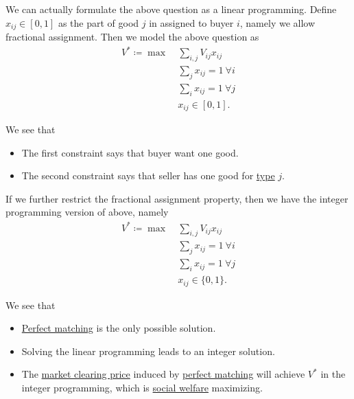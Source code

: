 We can actually formulate the above question as a linear programming. Define \(x_{ij} \in [0, 1]\) as the part of good \(j\) in assigned to buyer \(i\), namely we allow fractional assignment. Then we model the above question as
\[
	\begin{aligned}
		V^{\ast} \coloneqq \max~ & \sum\limits_{i, j}V_{ij}x_{ij}       \\
		                         & \sum\limits_{j}x_{ij} = 1\ \forall i \\
		                         & \sum\limits_{i}x_{ij} = 1\ \forall j \\
		                         & x_{ij}\in[0, 1].
	\end{aligned}
\]
\begin{intuition}
	We see that
	\begin{itemize}
		\item The first constraint says that buyer want one good.
		\item The second constraint says that seller has one good for \hyperref[def:type]{type} \(j\).
	\end{itemize}
\end{intuition}

If we further restrict the fractional assignment property, then we have the integer programming version of above, namely
\[
	\begin{aligned}
		V^{\ast} \coloneqq \max~ & \sum\limits_{i, j}V_{ij}x_{ij}       \\
		                         & \sum\limits_{j}x_{ij} = 1\ \forall i \\
		                         & \sum\limits_{i}x_{ij} = 1\ \forall j \\
		                         & x_{ij}\in\{0, 1\}.
	\end{aligned}
\]

\begin{remark}
	We see that
	\begin{itemize}
		\item \hyperref[def:perfect-matching]{Perfect matching} is the only possible solution.
		\item Solving the linear programming leads to an integer solution.
		\item The \hyperref[note:market-clearing-prices]{market clearing price} induced by \hyperref[def:perfect-matching]{perfect matching} will achieve \(V^{\ast}\) in the integer programming, which is \hyperref[def:social-welfare]{social welfare} maximizing.
	\end{itemize}
\end{remark}

